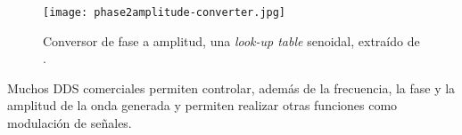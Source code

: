 \documentclass{article}
\newenvironment{standalone}{\begin{preview}}{\end{preview}}
\begin{document}
\begin{standalone}
  \begin{figure}[!htbp]
    \centering
    \texttt{[image: phase2amplitude-converter.jpg]}
    \caption{Conversor de fase a amplitud, una \textit{look-up table} senoidal, extraído de \cite{murphy2004}.}
    \label{fig:look-up-table}
  \end{figure}

  Muchos DDS comerciales permiten controlar, además de la frecuencia, la fase y la amplitud de la onda generada y permiten realizar otras funciones como modulación de señales.

\end{standalone}
\end{document}
